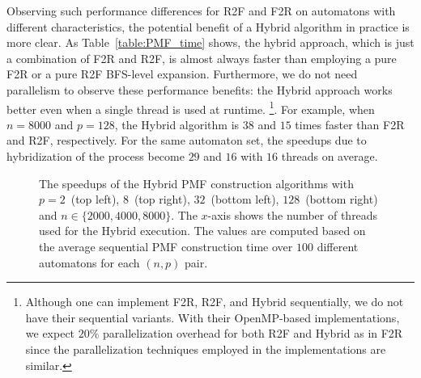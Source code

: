 \documentclass[12pt]{article}
\begin{document}
Observing such performance differences for R2F and F2R on automatons with different characteristics, the potential benefit of a Hybrid algorithm in practice is more clear. As Table~\ref{table:PMF_time} shows, the hybrid approach, which is just a combination of F2R and R2F, is almost always faster than employing a pure F2R or a pure R2F BFS-level expansion. Furthermore, we do not need parallelism to observe these performance benefits: the Hybrid approach works better even when a single thread is used at runtime. \footnote{Although one can implement F2R, R2F, and Hybrid sequentially, we do not have their sequential variants. With their OpenMP-based implementations, we expect $20\%$ parallelization overhead for both R2F and Hybrid as in F2R since the parallelization techniques employed in the implementations  are similar.}. For example, when $n = 8000$ and $p = 128$, the Hybrid algorithm is $38$ and $15$ times faster than F2R and R2F, respectively. For the same automaton set, the speedups due to hybridization of the process become $29$ and $16$ with $16$ threads on average.

\begin{figure}[ht]
	\centering
	\caption{The speedups of the Hybrid PMF construction algorithms with $p = 2$~(top left), $8$~(top right), $32$~(bottom left), $128$~(bottom right) and $n \in \{2000, 4000, 8000\}$. The $x$-axis shows the number of threads used for the Hybrid execution.  The values are computed based on the average sequential PMF construction time over $100$ different automatons for each $(n, p)$ pair.}
	\label{fig:hybrid-speedup}
\end{figure}
\end{document}
